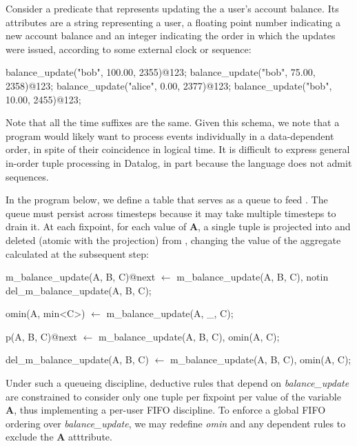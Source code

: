 Consider a predicate  that represents updating the a
user's account balance.  Its attributes are a string representing a user, a
floating point number indicating a new account balance and an integer
indicating the order in which the updates were issued, according to some
external clock or sequence:

\begin{Dedalus}
balance\_update("bob", 100.00, 2355)@123;
balance\_update("bob", 75.00, 2358)@123;
balance\_update("alice", 0.00, 2377)@123;
balance\_update("bob", 10.00, 2455)@123;
\end{Dedalus}

Note that all the time suffixes are the same.  
Given this schema, we note that a program would likely want to process
 events individually in a data-dependent order, in
spite of their coincidence in logical time.  It is difficult to express general
in-order tuple processing in Datalog, in part because the language does not
admit sequences.

In the program below, we define a table  that
serves as a queue to feed .  The queue must persist
across timesteps because it may take multiple timesteps to drain it.  At each
fixpoint, for each value of \textbf{A}, a single tuple is projected into
 and deleted (atomic with the projection) from
, changing the value of the aggregate calculated
at the subsequent step:

\begin{Dedalus}

m\_balance\_update(A, B, C)@next \(\leftarrow\)
  m\_balance\_update(A, B, C),
  notin del\_m\_balance\_update(A, B, C);

omin(A, min<C>) \(\leftarrow\)
  m\_balance_update(A, _, C);

p(A, B, C)@next \(\leftarrow\)
  m\_balance\_update(A, B, C),
  omin(A, C);

del\_m\_balance\_update(A, B, C) \(\leftarrow\)
  m\_balance\_update(A, B, C),
  omin(A, C);
\end{Dedalus}

Under such a queueing discipline, deductive rules that depend on
\emph{balance\_update} are constrained to consider only one tuple per fixpoint
per value of the variable \textbf{A}, thus implementing a per-user FIFO
discipline.  To enforce a global FIFO ordering over \emph{balance\_update}, we
may redefine \emph{omin} and any dependent rules to exclude the \textbf{A}
atttribute.

